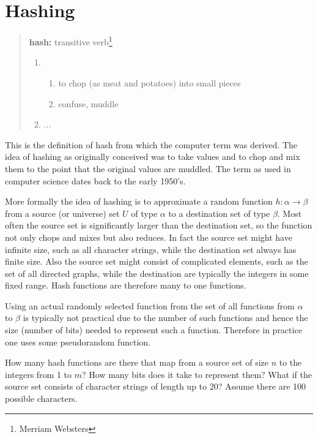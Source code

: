 \chapter{Hashing}
\label{ch:hash}
\label{ch:hashing}

\begin{quote}
{\bf hash:} transitive verb\footnote{Merriam Websters}
\begin{enumerate}
\item
\begin{enumerate}
\item
to chop (as meat and potatoes) into small pieces
\item
confuse, muddle
\end{enumerate}
\item ...
\end{enumerate}
\end{quote}

This is the definition of hash from which the computer term was
derived.  The idea of hashing as originally conceived was to take
values and to chop and mix them to the point that the original values
are muddled.  The term as used in computer science dates back to the
early 1950's.

More formally the idea of hashing is to approximate a random function
$h : \alpha \rightarrow \beta$ from a source (or universe) set $U$ of
type $\alpha$ to a
destination set of type $\beta$.  Most often the source set is significantly
larger than the destination set, so the function not only chops and
mixes but also reduces.  In fact the source set might have infinite
size, such as all character strings, while the destination set always
has finite size.  Also the source set might consist of complicated
elements, such as the set of all directed graphs, while the
destination are typically the integers in some fixed range.  Hash
functions are therefore many to one functions.

Using an actual randomly selected function from the set of all
functions from $\alpha$ to $\beta$ is typically not practical due to
the number of such functions and hence the size (number of bits)
needed to represent such a function.  Therefore in practice one uses
some pseudorandom function.

\begin{exercise}
How many hash functions are there that map from a source set of size $n$
to the integers from 1 to $m$?   How many bits does it take to represent
them?   What if the source set consists of character strings of length
up to 20? Assume there are 100 possible characters.
\end{exercise}

